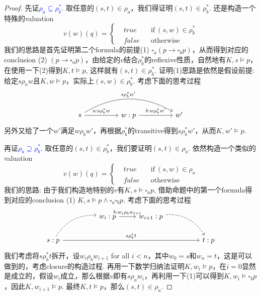 \documentclass{article}
\theoremstyle{plain}
\theoremstyle{nonumberplain}
\newtheorem{proof}{Proof}
\newcommand{\bluet}[1]{\textcolor{blue}{#1}}
\begin{document}
\begin{proof}
先证\bluet{$\rho_a \subseteq \rho_b^*$}. 取任意的$(s,t) \in \rho_a$，我们得证明$(s,t) \in \rho_b^*$. 还是构造一个特殊的valuation
$$
v(w)(q) = \left\{
\begin{aligned}
&true && \text{if}~(s,w) \in \rho_b^* \\
&false && \text{otherwise}
\end{aligned}
\right.
$$
我们的思路是首先证明第二个formula的前提(1) $\square_a(p \to \square_b p)$，从而得到对应的conclusion (2) $(p \to \square_a p)$，由给定的$v$结合$\rho_b^*$的reflexive性质，自然地有$K,s \vDash p$，在使用一下(2)得到$K,t \vDash p$, 这样就有$(s,t) \in \rho_b^*$.  证明(1)思路是依然是假设前提: 给定$s \rho_a w$且$K,w \vDash p$，实际上$(s,w) \in \rho_b^*$. 考虑下面的思考过程
$$
\begin{tikzcd}
s \arrow[rr, "a: s \rho_b^* w"] \arrow[rrrr, "s \rho_b^* w'", bend left] &  & w: p \arrow[rr, "b: w\rho_b^*w'"] &  & w'
\end{tikzcd}
$$
另外又给了一个$w'$满足$w \rho_b w'$，再根据$\rho_b^*$的transitive得到$s \rho_b^* w'$，从而$K,w' \vDash p$. 

再证\bluet{$\rho_a \supseteq \rho_b^*$}. 取任意的$(s,t) \in \rho_b^*$，我们要证明$(s,t) \in \rho_a$. 依然构造一个类似的valuation
$$
v(w)(q) = \left\{
\begin{aligned}
&true && \text{if}~(s,w) \in \rho_a \\
&false && \text{otherwise}
\end{aligned}
\right.
$$
我们的思路: 由于我们构造地特别的$v$有$K,s \vDash \square_a p$, 借助命题中的第一个formula得到对应的conclusion (1) $K,s \vDash p \wedge \square_a\square_b p$. 考虑下面的思考过程
$$
\begin{tikzcd}
                                                                 &  & w_i:p \arrow[r, "b: w_i \rho_b w_{i+1}"] & w_{i+1}:p \arrow[rrd, dashed, bend left] &  &     \\
s:p \arrow[rrrrr, "s \rho_b^* t"] \arrow[rru, dashed, bend left] &  &                                          &                                          &  & t:p
\end{tikzcd}
$$
我们考虑将$s \rho_b^* t$拆开，设$w_i \rho_b w_{i+1}$ for all $i < n$，其中$w_0 = s$和$w_n = t$，这是可以做到的，考虑closure的构造过程. 再用一下数学归纳法证明$K, w_i \vDash p$，在$i=0$显然是成立的，假设$w_i$成立，那么根据$v$即有$s \rho_a w_i$，再利用一下(1)可以得到$K,w_i \vDash \square_b p$，因此$K,w_{i+1} \vDash p$. 最终$K,t \vDash p$，那么$(s,t) \in \rho_a$. 
\end{proof}
\end{document}
